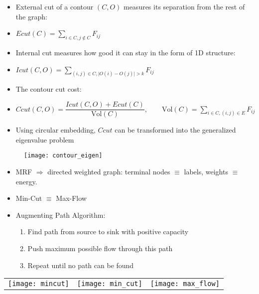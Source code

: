 \documentclass[11pt, a4paper, landscape]{article}
\begin{document}
\NewPage{}
\vfill
\begin{itemize}
\item External cut of a contour $(C, O)$ measures its separation from the rest of the graph:
\item[]
\begin{center}
$Ecut(C) = \sum\limits_{i \in C, j \notin C} F_{ij}$
\end{center}
\item Internal cut measures how good it can stay in the form of 1D structure:
\item[]
\begin{center}
$Icut(C, O) = \sum\limits_{(i, j) \in C, \lvert O(i) - O(j) \rvert > k} F_{ij}$
\end{center}
\item The contour cut cost:
\item[]
\begin{center}
$Ccut(C, O) = \dfrac{Icut(C, O) + Ecut(C)}{\mathrm{Vol}(C)}, \qquad \mathrm{Vol}(C) = \sum\limits_{i \in C, (i, j) \in E} F_{ij}$
\end{center}
\item Using circular embedding, $Ccut$ can be transformed into the generalized eigenvalue problem
\end{itemize}
\begin{figure}[htbp]
\centering
\texttt{[image: contour\_eigen]}
\end{figure}
\vfill





\NewPage{}
\vfill
\begin{itemize}
\item MRF $\Rightarrow$ directed weighted graph: terminal nodes $\equiv$ labels, weights $\equiv$ energy.
\item Min-Cut $\equiv$ Max-Flow
\item Augmenting Path Algorithm:
\begin{enumerate}
\item Find path from source to sink with positive capacity
\item Push maximum possible flow through this path
\item Repeat until no path can be found
\end{enumerate}
\end{itemize}
\begin{table}
  \centering
  \begin{tabular}{@{} M{.3\linewidth} M{.3\linewidth} M{.3\linewidth} @{}}
      \texttt{[image: mincut]}%
      &
      \texttt{[image: min\_cut]}%
      &
      \texttt{[image: max\_flow]}%
  \end{tabular}
\end{table}
\vfill
\end{document}
